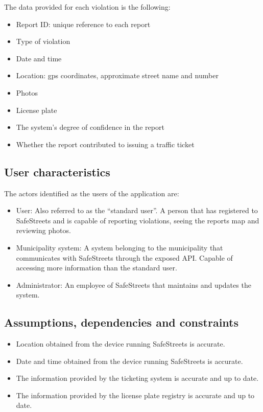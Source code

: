The data provided for each violation is the following:
\begin{itemize}
\item Report ID: unique reference to each report
\item Type of violation
\item Date and time
\item Location: gps coordinates, approximate street name and number
\item Photos
\item License plate
\item The system’s degree of confidence in the report
\item Whether the report contributed to issuing a traffic ticket
\end{itemize}


\subsection{User characteristics}
The actors identified as the users of the application are:
\begin{itemize}
\item
User: Also referred to as the “standard user”. A person that has registered to SafeStreets and is capable of reporting violations, seeing the reports map and reviewing photos. 
\item
Municipality system: A system belonging to the municipality that communicates with SafeStreets through the exposed API. Capable of accessing more information than the standard user.
\item
Administrator: An employee of SafeStreets that maintains and updates the system.
\end{itemize}

\subsection{Assumptions, dependencies and constraints}

\begin{itemize}[label={}]
    \item \begin{assumption} Location obtained from the device running SafeStreets is accurate. \end{assumption}
    \item \begin{assumption} Date and time obtained from the device running SafeStreets is accurate. \end{assumption}
    \item \begin{assumption} The information provided by the ticketing system is accurate and up to date. \end{assumption}
    \item \begin{assumption} The information provided by the license plate registry is accurate and up to date. \end{assumption}
\end{itemize}
